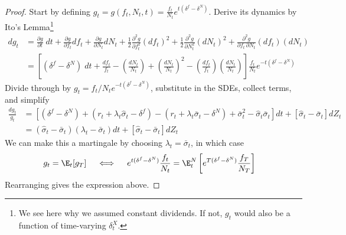 \documentclass[12pt]{article}
\theoremstyle{plain}
\theoremstyle{definition}
\theoremstyle{remark}
\begin{document}
\begin{proof}
Start by defining
$g_t=g(f_t,N_t,t)= \frac{f_t}{N_t} e^{t(\delta^f-\delta^N)}$.
Derive its dynamics by Ito's Lemma\footnote{%
  We see here why we assumed constant dividends. If not, $g_t$ would
  also be a function of time-varying $\delta_t^X$.
}
\begin{align*}
  dg_t
  &=
  \frac{\partial g}{\partial t}
  \;dt
  +
  \frac{\partial g}{\partial f_t}
  df_t
  +
  \frac{\partial g}{\partial N_t}
  dN_t
  +
  \frac{1}{2}
  \frac{\partial^2 g}{\partial f^2_t}
  (df_t)^2
  +
  \frac{1}{2}
  \frac{\partial^2 g}{\partial N_t^2}
  (dN_t)^2
  +
  \frac{\partial^2 g}{\partial f_t\,\partial N_t}
  (df_t)
  (dN_t)
  \\
  &=
  \left[
  (\delta^f-\delta^N)
  \;dt
  +
  \frac{df_t}{f_t}
  -
  \left(
  \frac{dN_t}{N_t}
  \right)
  +
  \left(
  \frac{dN_t}{N_t}
  \right)^2
  -
  \left(
    \frac{df_t}{f_t}
  \right)
  \left(
  \frac{dN_t}{N_t}
  \right)
  \right]
  \frac{f_t}{N_t}
  e^{-t(\delta^f-\delta^N)}
\end{align*}
Divide through by $g_t=f_t/N_te^{-t(\delta^f-\delta^N)}$, substitute
in the SDEs, collect terms, and simplify
\begin{align*}
  \frac{dg_t}{g_t}
  &=
  \left[
  (\delta^f-\delta^N)
  + (r_t + \lambda_t\hat{\sigma}_{t} - \delta^f)
  - (r_t +\lambda_t\bar{\sigma}_{t} - \delta^N)
  +\bar{\sigma}_{t}^2
  -
  \hat{\sigma}_{t}
  \bar{\sigma}_{t}
  \right]
  dt
  +
  \left[
  \hat{\sigma}_{t}
  -
  \bar{\sigma}_{t}
  \right]
  dZ_t
  \\
  &=
  (\hat{\sigma}_{t} -\bar{\sigma}_{t})
  (\lambda_t-\bar{\sigma}_{t})
  dt
  +
  \left[
  \hat{\sigma}_{t}
  -
  \bar{\sigma}_{t}
  \right]
  dZ_t
\end{align*}
We can make this a martingale by choosing $\lambda_t=\bar{\sigma}_{t}$,
in which case
\begin{align*}
  g_t = \E_t[g_T]
  \quad\iff\quad
  e^{t(\delta^f-\delta^N)}
  \frac{f_t}{N_t}
  &=
  \E_t^{N}
  \left[
  e^{T(\delta^f-\delta^N)}
  \frac{f_T}{N_T}
  \right]
\end{align*}
Rearranging gives the expression above.
\end{proof}
\end{document}
